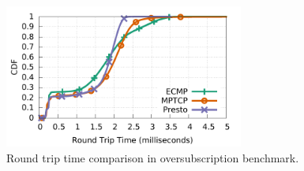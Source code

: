 \begin{figure}[!t]
        \centering
  \includegraphics[width=0.7\textwidth]{presto/figures/congestion_test/congestion_compare_latency.pdf}
        \caption{Round trip time comparison in oversubscription benchmark.
		}
        \label{micro_congestion_test_latency}
\end{figure}



